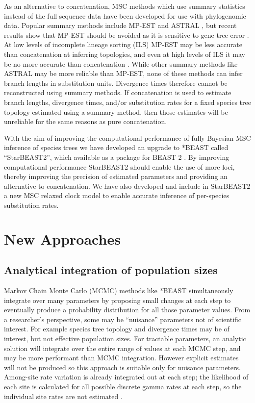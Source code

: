 \documentclass[12pt]{article}
\begin{document}
As an alternative to concatenation, MSC methods which use summary statistics instead
of the full sequence data have been developed for use with phylogenomic data.
Popular summary methods include MP-EST and ASTRAL \citep{Liu2010,
Mirarab01092014}, but recent results show that MP-EST should be avoided as it is
sensitive to gene tree error \citep{Mirarab15062015, Xi201563}. At low levels of
incomplete lineage sorting (ILS) MP-EST may be less accurate than concatenation at
inferring topologies, and even at high levels of ILS it may be no more accurate
than concatenation \citep{Ogilvie01052016}. While other summary methods like
ASTRAL may be more reliable than MP-EST, none of these methods can infer branch
lengths in substitution units. Divergence times therefore cannot be
reconstructed using summary methods. If concatenation is used to estimate branch
lengths, divergence times, and/or substitution rates for a fixed species tree
topology estimated using a summary method, then those estimates will be
unreliable for the same reasons as pure concatenation.

With the aim of improving the computational performance of fully Bayesian
MSC inference of species trees we have developed an upgrade
to *BEAST called ``StarBEAST2'', which available as a package for BEAST 2
\citep{10.1371/journal.pcbi.1003537}. By improving computational performance
StarBEAST2 should enable the use of more loci, thereby improving the precision
of estimated parameters and providing an alternative to concatenation. We have
also developed and include in StarBEAST2 a new MSC relaxed
clock model to enable accurate inference of per-species substitution rates.

\section*{New Approaches}

\subsection*{Analytical integration of population sizes}

Markov Chain Monte Carlo (MCMC) methods like *BEAST simultaneously integrate
over many parameters by proposing small changes at each step to eventually
produce a probability distribution for all those parameter values. From a
researcher's perspective, some may be ``nuisance'' parameters not of scientific
interest. For example species tree topology and divergence times may be of
interest, but not effective population sizes. For tractable parameters, an
analytic solution will integrate over the entire range of values at each MCMC
step, and may be more performant than MCMC integration. However explicit
estimates will not be produced so this approach is suitable only for nuisance
parameters. Among-site rate variation is already integrated out at each step;
the likelihood of each site is calculated for all possible discrete gamma rates
at each step, so the individual site rates are not estimated \citep{Yang1994}.
\end{document}
